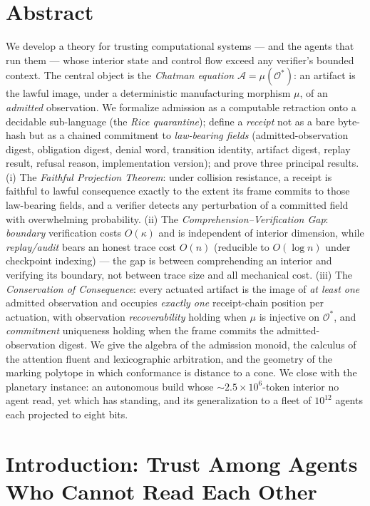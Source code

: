 \documentclass[11pt,oneside]{book}
\theoremstyle{definition}
\theoremstyle{plain}
\theoremstyle{remark}
\newcommand{\Adm}{\mathcal{O}^{*}}             %
\newcommand{\Act}{\mathcal{A}}                 %
\newcommand{\muop}{\mu}                        %
\newcommand{\CL}{\kappa}                       %
\begin{document}
\chapter*{Abstract}
We develop a theory for trusting computational systems --- and the agents that run them
--- whose interior state and control flow exceed any verifier's bounded context. The
central object is the \emph{Chatman equation} $\Act = \muop(\Adm)$: an artifact is the
lawful image, under a deterministic manufacturing morphism $\muop$, of an \emph{admitted}
observation. We formalize admission as a computable retraction onto a decidable
sub-language (the \emph{Rice quarantine}); define a \emph{receipt} not as a bare byte-hash
but as a chained commitment to \emph{law-bearing fields} (admitted-observation digest,
obligation digest, denial word, transition identity, artifact digest, replay result,
refusal reason, implementation version); and prove three principal results. (i) The
\emph{Faithful Projection Theorem}: under collision resistance, a receipt is faithful to
lawful consequence exactly to the extent its frame commits to those law-bearing fields, and
a verifier detects any perturbation of a committed field with overwhelming probability.
(ii) The \emph{Comprehension--Verification Gap}: \emph{boundary} verification costs
$O(\CL)$ and is independent of interior dimension, while \emph{replay/audit} bears an
honest trace cost $O(n)$ (reducible to $O(\log n)$ under checkpoint indexing) --- the gap
is between comprehending an interior and verifying its boundary, not between trace size and
all mechanical cost. (iii) The \emph{Conservation of Consequence}: every actuated artifact
is the image of \emph{at least one} admitted observation and occupies \emph{exactly one}
receipt-chain position per actuation, with observation \emph{recoverability} holding when
$\muop$ is injective on $\Adm$, and \emph{commitment} uniqueness holding when the frame
commits the admitted-observation digest. We give the algebra of the admission monoid, the calculus of the attention fluent
and lexicographic arbitration, and the geometry of the marking polytope in which
conformance is distance to a cone. We close with the planetary instance: an autonomous
build whose $\sim\!2.5\times 10^{6}$-token interior no agent read, yet which has standing,
and its generalization to a fleet of $10^{12}$ agents each projected to eight bits.

\tableofcontents

\mainmatter

\chapter{Introduction: Trust Among Agents Who Cannot Read Each Other}
\end{document}
